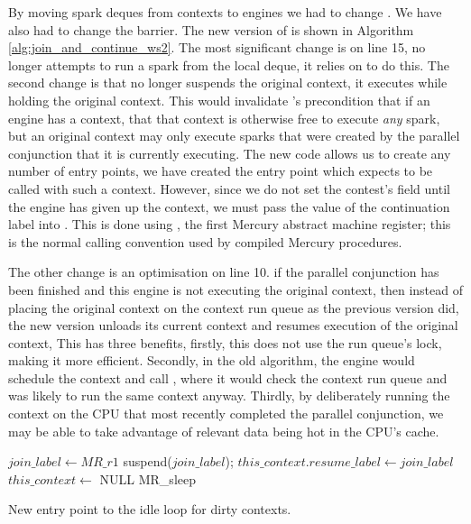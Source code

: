 By moving spark deques from contexts to engines we had to change \idle.
We have also had to change the \joinandcontinue barrier.
The new version of \joinandcontinue is shown in Algorithm
\ref{alg:join_and_continue_ws2}.
The most significant change is on line 15,
\joinandcontinue no longer attempts to run a spark from the local deque,
it relies on \idle to do this.
The second change is that \joinandcontinue no longer suspends the original
context, it executes \idle while holding the original context.
This would invalidate \idle's precondition that if an engine has a context,
that that context is otherwise free to execute \emph{any} spark,
but an original context may only execute sparks that were created by the
parallel conjunction that it is currently executing.
The new \idle code allows us to create any number of entry points,
we have created the \idleorigcontext entry point which expects to be called
with such a context.
However, since we do not set the contest's  field until
the engine has given up the context,
we must pass the value of the continuation label into \idleorigcontext.
This is done using , the first Mercury abstract machine
register;
this is the normal calling convention used by compiled Mercury procedures.

The other change is an optimisation on line 10.
if the parallel conjunction has been finished and this engine is not
executing the original context,
then instead of placing the original context on the context run queue as the
previous version did,
the new version unloads its current context and resumes execution of the
original context,
This has three benefits,
firstly, this does not use the run queue's lock,
making it more efficient.
Secondly, in the old algorithm, the engine would schedule the context and
call \idle,
where it would check the context run queue and was likely to run the same
context anyway.
Thirdly, by deliberately running the context on the CPU that most
recently completed the parallel conjunction,
we may be able to take advantage of relevant data being hot in the CPU's
cache.

\begin{algorithm}[tbp]
\begin{algorithmic}
        \State $join\_label \gets MR\_r1$
        \State {}
        \State suspend($join\_label$);
        \State $this\_context.resume\_label \gets join\_label$
        \State $this\_context \gets$ NULL
        \State {}
        \State {}
        \State {}
        \Goto MR\_sleep
    \EndProcedure
\end{algorithmic}
\caption{New entry point to the idle loop for dirty contexts.}
\label{alg:idle_orig_context}
\end{algorithm}

